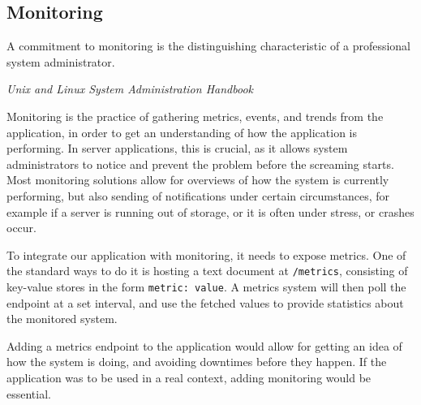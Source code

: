 \subsection{Monitoring}
\epigraph{A commitment to monitoring is the distinguishing characteristic of a professional system administrator.}{\textit{Unix and Linux System Administration Handbook\cite{sysadmin}}}

Monitoring is the practice of gathering metrics, events, and trends from the application, in order to get an understanding of how the application is performing.
In server applications, this is crucial, as it allows system administrators to notice and prevent the problem before the screaming starts.
Most monitoring solutions allow for overviews of how the system is currently performing, but also sending of notifications under certain circumstances, for example if a server is running out of storage, or it is often under stress, or crashes occur.\cite{sysadmin}

To integrate our application with monitoring, it needs to expose metrics.
One of the standard ways to do it is hosting a text document at \texttt{/metrics}, consisting of key-value stores in the form \texttt{metric: value}.
A metrics system will then poll the endpoint at a set interval, and use the fetched values to provide statistics about the monitored system.

Adding a metrics endpoint to the application would allow for getting an idea of how the system is doing, and avoiding downtimes before they happen. If the application was to be used in a real context, adding monitoring would be essential.

